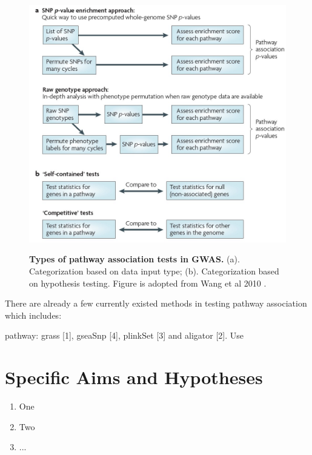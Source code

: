 \documentclass[12pt]{article}
\begin{document}
\begin{figure}[H]
\centering
\includegraphics[scale=0.5]{pathwayTests_definition}
\label{fig: pathwayTests}
\caption{ \textbf{Types of pathway association tests in GWAS.} (a). Categorization based on data input type; (b). Categorization based on hypothesis testing. Figure is adopted from Wang et al 2010 \cite{Wang2010}. }
\end{figure}

There are already a few currently existed methods in testing pathway association which includes:  

pathway: grass [1], gseaSnp [4], plinkSet [3] and aligator [2]. Use

\newpage
\section{Specific Aims and Hypotheses}\label{sec:aims}

\begin{enumerate}
\item One

\item Two

\item ...
\end{enumerate}
\end{document}
